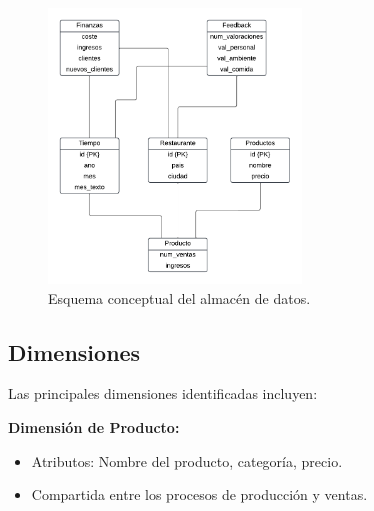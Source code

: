 \documentclass[12pt]{opticajnl}
\begin{document}
\begin{figure}[h]
\centering
\includegraphics[width=0.6\textwidth]{fotos/3.pdf}
\caption{Esquema conceptual del almacén de datos.}
\label{fig:esquema_almacen}
\end{figure}











































\subsection{Dimensiones}
Las principales dimensiones identificadas incluyen:

\textbf{Dimensión de Producto:} 
\begin{itemize}
    \item Atributos: Nombre del producto, categoría, precio.
    \item Compartida entre los procesos de producción y ventas.
\end{itemize}
\end{document}
